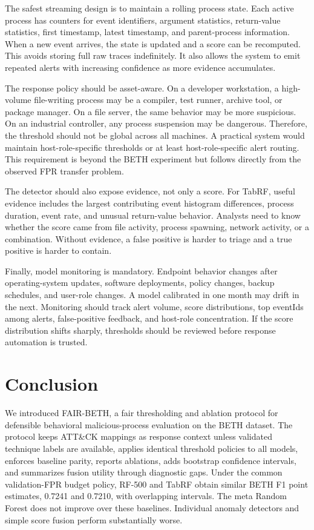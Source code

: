 \documentclass[journal]{IEEEtran}
\begin{document}
The safest streaming design is to maintain a rolling process state. Each active process has counters for event identifiers, argument statistics, return-value statistics, first timestamp, latest timestamp, and parent-process information. When a new event arrives, the state is updated and a score can be recomputed. This avoids storing full raw traces indefinitely. It also allows the system to emit repeated alerts with increasing confidence as more evidence accumulates.

The response policy should be asset-aware. On a developer workstation, a high-volume file-writing process may be a compiler, test runner, archive tool, or package manager. On a file server, the same behavior may be more suspicious. On an industrial controller, any process suspension may be dangerous. Therefore, the threshold should not be global across all machines. A practical system would maintain host-role-specific thresholds or at least host-role-specific alert routing. This requirement is beyond the BETH experiment but follows directly from the observed FPR transfer problem.

The detector should also expose evidence, not only a score. For TabRF, useful evidence includes the largest contributing event histogram differences, process duration, event rate, and unusual return-value behavior. Analysts need to know whether the score came from file activity, process spawning, network activity, or a combination. Without evidence, a false positive is harder to triage and a true positive is harder to contain.

Finally, model monitoring is mandatory. Endpoint behavior changes after operating-system updates, software deployments, policy changes, backup schedules, and user-role changes. A model calibrated in one month may drift in the next. Monitoring should track alert volume, score distributions, top eventIds among alerts, false-positive feedback, and host-role concentration. If the score distribution shifts sharply, thresholds should be reviewed before response automation is trusted.

\section{Conclusion}
\label{sec:conclusion}

We introduced FAIR-BETH, a fair thresholding and ablation protocol for defensible behavioral malicious-process evaluation on the BETH dataset. The protocol keeps ATT\&CK mappings as response context unless validated technique labels are available, applies identical threshold policies to all models, enforces baseline parity, reports ablations, adds bootstrap confidence intervals, and summarizes fusion utility through diagnostic gaps. Under the common validation-FPR budget policy, RF-500 and TabRF obtain similar BETH F1 point estimates, 0.7241 and 0.7210, with overlapping intervals. The meta Random Forest does not improve over these baselines. Individual anomaly detectors and simple score fusion perform substantially worse.
\end{document}
